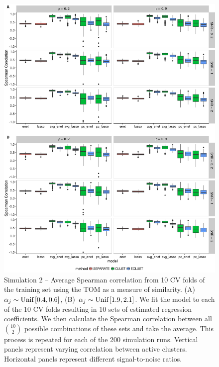 \begin{appendices}
\begin{figure}[H]
	\centering
	\includegraphics[scale=0.52, keepaspectratio]{./figs/hydra/results/figures/sim2-sept8/spearman_TOM_sim2.png}
	\caption{Simulation 2 -- Average Spearman correlation from 10 CV folds of the training set using the TOM as a measure of similarity. \mbox{(A) $\alpha_{j} \sim \textrm{{Unif}}\left[0.4, 0.6\right]$}, \mbox{(B) $\alpha_{j} \sim \textrm{{Unif}}\left[1.9, 2.1\right]$}. We fit the model to each of the 10 CV folds resulting in 10 sets of estimated regression coefficients. We then calculate the Spearman correlation between all $\binom{10}{2}$ possible combinations of these sets and take the average. This process is repeated for each of the 200 simulation runs. Vertical panels represent varying correlation between active clusters. Horizontal panels represent different signal-to-noise ratios.}
	\label{fig:spearman_TOM_sim2}
\end{figure}


\end{appendices}

